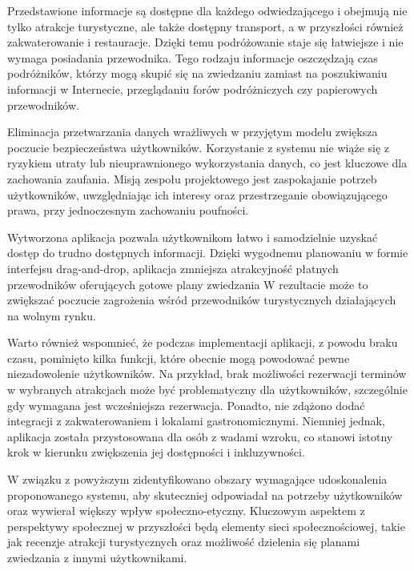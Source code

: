 \indent Przedstawione informacje są dostępne dla każdego odwiedzającego i obejmują nie tylko atrakcje turystyczne, ale także dostępny transport, a w przyszłości również zakwaterowanie i restauracje.
Dzięki temu podróżowanie staje się łatwiejsze i nie wymaga posiadania przewodnika.
Tego rodzaju informacje oszczędzają czas podróżników, którzy mogą skupić się na zwiedzaniu zamiast na poszukiwaniu informacji w Internecie, przeglądaniu forów podróżniczych czy papierowych przewodników.

\indent Eliminacja przetwarzania danych wrażliwych w przyjętym modelu zwiększa poczucie bezpieczeństwa użytkowników.
Korzystanie z systemu nie wiąże się z ryzykiem utraty lub nieuprawnionego wykorzystania danych, co jest kluczowe dla zachowania zaufania.
Misją zespołu projektowego jest zaspokajanie potrzeb użytkowników, uwzględniając ich interesy oraz przestrzeganie obowiązującego prawa, przy jednoczesnym zachowaniu poufności.

\indent Wytworzona aplikacja pozwala użytkownikom łatwo i samodzielnie uzyskać dostęp do trudno dostępnych informacji.
Dzięki wygodnemu planowaniu w formie interfejsu drag-and-drop, aplikacja zmniejsza atrakcyjność płatnych przewodników oferujących gotowe plany zwiedzania
W rezultacie może to zwiększać poczucie zagrożenia wśród przewodników turystycznych działających na wolnym rynku.

\indent Warto również wspomnieć, że podczas implementacji aplikacji, z powodu braku czasu, pominięto kilka funkcji, które obecnie mogą powodować pewne niezadowolenie użytkowników.
Na przykład, brak możliwości rezerwacji terminów w wybranych atrakcjach może być problematyczny dla użytkowników, szczególnie gdy wymagana jest wcześniejsza rezerwacja.
Ponadto, nie zdążono dodać integracji z zakwaterowaniem i lokalami gastronomicznymi.
Niemniej jednak, aplikacja została przystosowana dla osób z wadami wzroku, co stanowi istotny krok w kierunku zwiększenia jej dostępności i inkluzywności.

\indent W związku z powyższym zidentyfikowano obszary wymagające udoskonalenia proponowanego systemu, aby skuteczniej odpowiadał na potrzeby użytkowników oraz wywierał większy wpływ społeczno-etyczny.
Kluczowym aspektem z perspektywy społecznej w przyszłości będą elementy sieci społecznościowej, takie jak recenzje atrakcji turystycznych oraz możliwość dzielenia się planami zwiedzania z innymi użytkownikami.

